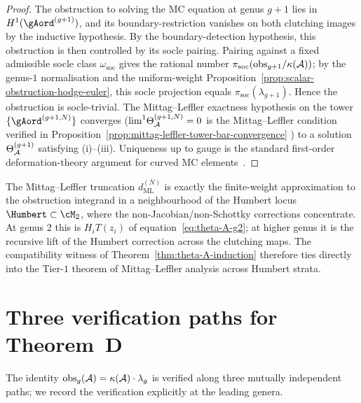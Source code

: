 \begin{proof}
The obstruction to solving the MC equation at genus $g+1$ lies in
$H^{1}({\gAord}^{(g+1)})$, and its boundary-restriction vanishes on
both clutching images by the inductive hypothesis. By the
boundary-detection hypothesis, this obstruction is then controlled by
its socle pairing. Pairing against a fixed admissible socle class
$\omega_{\mathrm{soc}}$ gives the rational number
$\pi_{\mathrm{soc}}(\mathrm{obs}_{g+1}/\kappa(\mathcal{A}))$; by the
genus-$1$ normalisation and the uniform-weight
Proposition~\ref{prop:scalar-obstruction-hodge-euler}, this socle
projection equals $\pi_{\mathrm{soc}}(\lambda_{g+1})$. Hence the
obstruction is socle-trivial. The Mittag--Leffler exactness hypothesis
on the tower
$\{{\gAord}^{(g+1,N)}\}$ converges
\textup{(}$\mathrm{lim}^{1}\Theta_{\mathcal{A}}^{(g+1,N)}=0$ is the
Mittag--Leffler condition verified in
Proposition~\textup{\ref{prop:mittag-leffler-tower-bar-convergence}}%
\textup{)} to a solution $\Theta_{\mathcal{A}}^{(g+1)}$ satisfying (i)--(iii).
Uniqueness up to gauge is the standard first-order deformation-theory
argument for curved MC elements~\cite{Kontsevich97,Costello11}.
\end{proof}

\begin{remark}
\label{rem:theta-A-humbert-tier1}
The Mittag--Leffler truncation $d_{\mathrm{ML}}^{(N)}$ is
exactly the finite-weight approximation to the obstruction
integrand in a neighbourhood of the Humbert locus
$\Humbert\subset\cM_{2}$, where the non-Jacobian/non-Schottky
corrections concentrate. At genus $2$ this is $H_{i}T(z_{i})$ of
equation~\eqref{eq:theta-A-g2}; at higher genus it is the recursive
lift of the Humbert correction across the clutching maps. The
compatibility witness of Theorem~\ref{thm:theta-A-induction}
therefore ties directly into the Tier-$1$ theorem of
Mittag--Leffler analysis across Humbert strata.
\end{remark}

\section{Three verification paths for Theorem~D}
\label{sec:theorem-D-three-paths}

The identity $\mathrm{obs}_g(\mathcal{A})=\kappa(\mathcal{A})\cdot\lambda_g$ is
verified along three mutually independent paths; we record the
verification explicitly at the leading genera.

